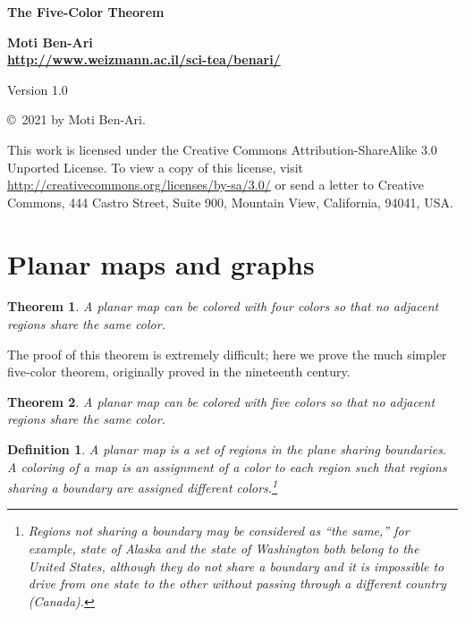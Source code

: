 \documentclass[11pt,a4paper]{article}
\newtheorem{theorem}{Theorem}
\newtheorem{definition}{Definition}
\begin{document}
\thispagestyle{empty}
\begin{center}
\textbf{\LARGE The Five-Color Theorem}

\bigskip

\textbf{\Large Moti Ben-Ari\\\bigskip\url{http://www.weizmann.ac.il/sci-tea/benari/}}

Version 1.0
\end{center}

\begin{footnotesize}
\begin{center}
\copyright{}\  2021 by Moti Ben-Ari. 
\end{center}
This work is licensed under the Creative Commons Attribution-ShareAlike 3.0 Unported License. To view a copy of this license, visit \url{http://creativecommons.org/licenses/by-sa/3.0/} or send a letter to Creative Commons, 444 Castro Street, Suite 900, Mountain View, California, 94041, USA.
\end{footnotesize}

\section{Planar maps and graphs}\label{s.planar}

\begin{theorem}
A planar map can be colored with four colors so that no adjacent regions share the same color.
\end{theorem}

The proof of this theorem is extremely difficult; here we prove the much simpler five-color theorem, originally proved in the nineteenth century.

\begin{theorem}
A planar map can be colored with five colors so that no adjacent regions share the same color.
\end{theorem}

\begin{definition}
A \textit{planar map} is a set of regions in the plane sharing boundaries. A \textit{coloring} of a map is an assignment of a color to each region such that regions sharing a boundary are assigned different colors.\footnote{Regions not sharing a boundary may be considered as ``the same,'' for example, state of Alaska and the state of Washington both belong to the United States, although they do not share a boundary and it is impossible to drive from one state to the other without passing through a different country (Canada).}
\end{definition}
\end{document}
